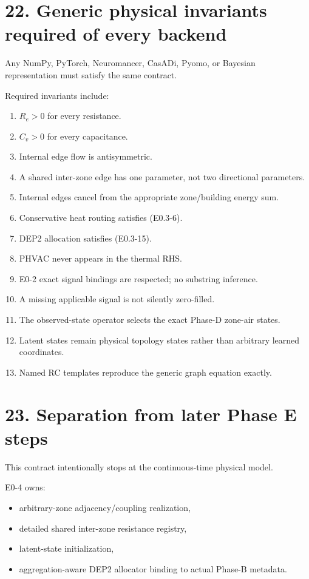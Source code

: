\documentclass[11pt]{article}
\begin{document}
\section*{22. Generic physical invariants required of every backend}

Any NumPy, PyTorch, Neuromancer, CasADi, Pyomo, or Bayesian representation
must satisfy the same contract.

Required invariants include:

\begin{enumerate}
    \item $R_e>0$ for every resistance.
    \item $C_v>0$ for every capacitance.
    \item Internal edge flow is antisymmetric.
    \item A shared inter-zone edge has one parameter, not two directional
          parameters.
    \item Internal edges cancel from the appropriate zone/building energy sum.
    \item Conservative heat routing satisfies (E0.3-6).
    \item DEP2 allocation satisfies (E0.3-15).
    \item PHVAC never appears in the thermal RHS.
    \item E0-2 exact signal bindings are respected; no substring inference.
    \item A missing applicable signal is not silently zero-filled.
    \item The observed-state operator selects the exact Phase-D zone-air states.
    \item Latent states remain physical topology states rather than arbitrary
          learned coordinates.
    \item Named RC templates reproduce the generic graph equation exactly.
\end{enumerate}

\section*{23. Separation from later Phase E steps}

This contract intentionally stops at the continuous-time physical model.

E0-4 owns:
\begin{itemize}
    \item arbitrary-zone adjacency/coupling realization,
    \item detailed shared inter-zone resistance registry,
    \item latent-state initialization,
    \item aggregation-aware DEP2 allocator binding to actual Phase-B metadata.
\end{itemize}
\end{document}
